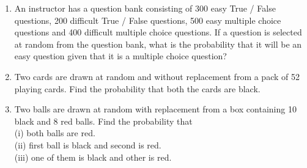\begin{enumerate}[label=\thesection.\arabic*.,ref=\thesection.\theenumi]
\item  An instructor has a question bank consisting of 300 easy True / False questions,
200 difficult True / False questions, 500 easy multiple choice questions and 400 difficult multiple choice questions. If a question is selected at random from the question bank, what is the probability that it will be an easy question given that it is a multiple choice question?\\
\solution

\item Two cards are drawn at random and without replacement from a pack of 52 playing cards. Find the probability that both the cards are black.\\
\solution

\item Two balls are drawn at random with replacement from a box containing 10 black and 8 red balls. Find the probability that\\
(i) both balls are red.\\
(ii) first ball is black and second is red.\\
(iii) one of them is black and other is red.\\
\solution



\end{enumerate}
